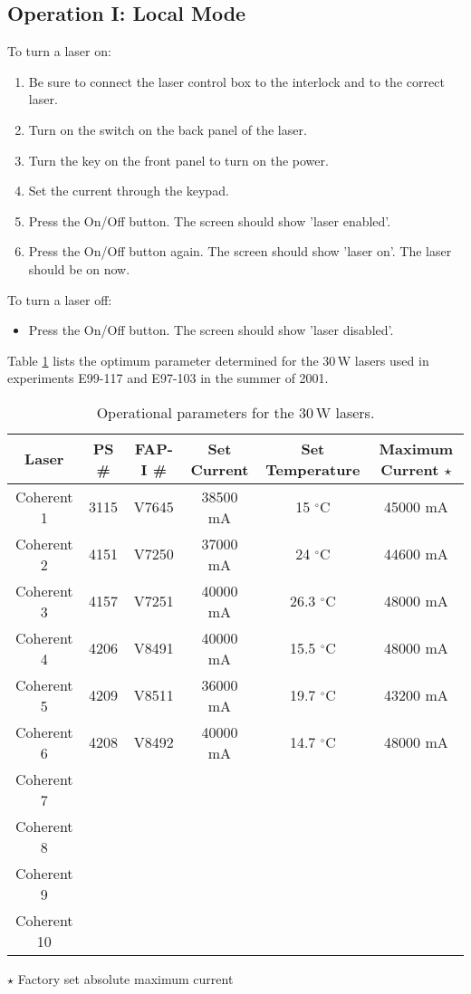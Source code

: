 {\subsection{Operation I: Local Mode}
To turn a laser on:
\begin{enumerate} \setlength{\parskip}{0ex}
\item Be sure to connect the laser control box to the interlock and to
the correct laser.
\item Turn on the switch on the back panel of the laser.
\item Turn the key on the front panel to turn on the power.
\item Set the current through the keypad.
\item Press the On/Off button.  The screen should show 'laser enabled'.
\item Press the On/Off button again.  The screen should show 'laser on'. The 
      laser should be on now.
\end{enumerate}
To turn a laser off:
\begin{itemize}
\item Press the On/Off button.  The screen should show 'laser disabled'.
\end{itemize}

Table \ref{tab:laserparam} lists the optimum parameter
determined for the 30\,W lasers used in experiments E99-117 and E97-103
in the summer of 2001.

\begin{table}[hbp]
\begin{center}
\begin{tabular}{|c|c|c|c|c|c|}\hline

 Laser        & PS \#  &  FAP-I \#  &  Set Current & Set Temperature & Maximum Current $\star$\\ \hline
 Coherent 1   & 3115   &  V7645     & 38500 mA  &   15 $^\circ$C     &  45000 mA\\ \hline
 Coherent 2   & 4151   &  V7250     & 37000 mA  &   24 $^\circ$C     & 44600 mA    \\ \hline
 Coherent 3   & 4157   &  V7251     & 40000 mA  &   26.3 $^\circ$C   & 48000 mA    \\ \hline
 Coherent 4   & 4206   &  V8491     & 40000 mA  &   15.5 $^\circ$C   & 48000 mA    \\ \hline
 Coherent 5   & 4209   &  V8511     & 36000 mA  &   19.7 $^\circ$C   & 43200 mA    \\ \hline
 Coherent 6   & 4208   &  V8492     & 40000 mA  &   14.7 $^\circ$C   & 48000 mA    \\ \hline
 Coherent 7  && & &  &       \\ \hline
 Coherent 8  && & &  &       \\ \hline
 Coherent 9  && & &  &       \\ \hline
 Coherent 10  && & &  &       \\ \hline
\end{tabular}
 $\star$ Factory set absolute maximum current 
\end{center}
\caption{Operational parameters for the 30\,W lasers.}
\label{tab:laserparam}
\end{table}



}
